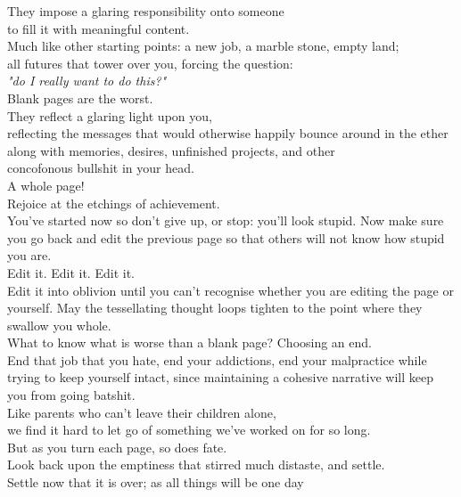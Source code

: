 They impose a glaring responsibility onto someone\\
to fill it with meaningful content.\\
Much like other starting points:
a new job, a marble stone, empty land;\\
all futures that tower over you, forcing the question:\\
\emph{"do I really want to do this?"}
\vspace{7pt}\\
Blank pages are the worst.\\
They reflect a glaring light upon you,\\reflecting the messages that would otherwise happily bounce around in the ether along with memories, desires, unfinished projects, and other\\
concofonous bullshit in your head.
\vspace{7pt}\\
A whole page!\\
Rejoice at the etchings of achievement.\\You've started now so don't give up, or stop: you'll look stupid. Now make sure you go back and edit the previous page so that others will not know how stupid you are.
\vspace{7pt}\\
Edit it. Edit it. Edit it.\\
Edit it into oblivion until you can't recognise whether you are editing the page or yourself. May the tessellating thought loops tighten to the point where they swallow you whole.
\vspace{7pt}\\
What to know what is worse than a blank page?
Choosing an end.\\End that job that you hate, end your addictions, end your malpractice while trying to keep yourself intact, since maintaining a cohesive narrative will keep you from going batshit.
\vspace{7pt}\\
Like parents who can't leave their children alone,\\ we find it hard to let go of something we've worked on for so long.\\
But as you turn each page, so does fate.\\Look back upon the emptiness that stirred much distaste,
and settle.\\
Settle now that it is over; as all things will be one day
\clearpage

